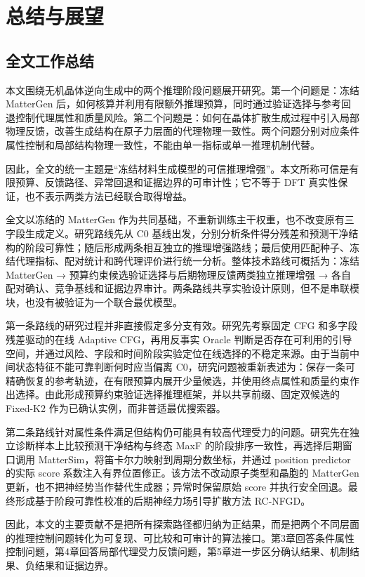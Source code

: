\chapter{总结与展望}

\section{全文工作总结}

本文围绕无机晶体逆向生成中的两个推理阶段问题展开研究。第一个问题是：冻结 MatterGen 后，如何核算并利用有限额外推理预算，同时通过验证选择与参考回退控制代理属性和质量风险。第二个问题是：如何在晶体扩散生成过程中引入局部物理反馈，改善生成结构在原子力层面的代理物理一致性。两个问题分别对应条件属性控制和局部结构物理一致性，不能由单一指标或单一推理机制代替。

因此，全文的统一主题是“冻结材料生成模型的可信推理增强”。本文所称可信是有限预算、反馈路径、异常回退和证据边界的可审计性；它不等于 DFT 真实性保证，也不表示两类方法已经联合取得增益。


全文以冻结的 MatterGen 作为共同基础，不重新训练主干权重，也不改变原有三字段生成定义。研究路线先从 C0 基线出发，分别分析条件得分残差和预测干净结构的阶段可靠性；随后形成两条相互独立的推理增强路线；最后使用匹配种子、冻结代理指标、配对统计和跨代理评价进行统一分析。整体技术路线可概括为：冻结 MatterGen → 预算约束候选验证选择与后期物理反馈两类独立推理增强 → 各自配对确认、竞争基线和证据边界审计。两条路线共享实验设计原则，但不是串联模块，也没有被验证为一个联合最优模型。

第一条路线的研究过程并非直接假定多分支有效。研究先考察固定 CFG 和多字段残差驱动的在线 Adaptive CFG，再用反事实 Oracle 判断是否存在可利用的引导空间，并通过风险、字段和时间阶段实验定位在线选择的不稳定来源。由于当前中间状态特征不能可靠判断何时应当偏离 C0，研究问题被重新表述为：保存一条可精确恢复的参考轨迹，在有限预算内展开少量候选，并使用终点属性和质量约束作出选择。由此形成预算约束验证选择推理框架，并以共享前缀、固定双候选的 Fixed-K2 作为已确认实例，而非普适最优搜索器。

第二条路线针对属性条件满足但结构仍可能具有较高代理受力的问题。研究先在独立诊断样本上比较预测干净结构与终态 MaxF 的阶段排序一致性，再选择后期窗口调用 Matter\allowbreak Sim，将笛卡尔力映射到周期分数坐标，并通过 position predictor 的实际 score 系数注入有界位置修正。该方法不改动原子类型和晶胞的 MatterGen 更新，也不把神经势当作替代生成器；异常时保留原始 score 并执行安全回退。最终形成基于阶段可靠性校准的后期神经力场引导扩散方法 RC-NFGD。

因此，本文的主要贡献不是把所有探索路径都归纳为正结果，而是把两个不同层面的推理控制问题转化为可复现、可比较和可审计的算法接口。第3章回答条件属性控制问题，第4章回答局部代理受力反馈问题，第5章进一步区分确认结果、机制结果、负结果和证据边界。

